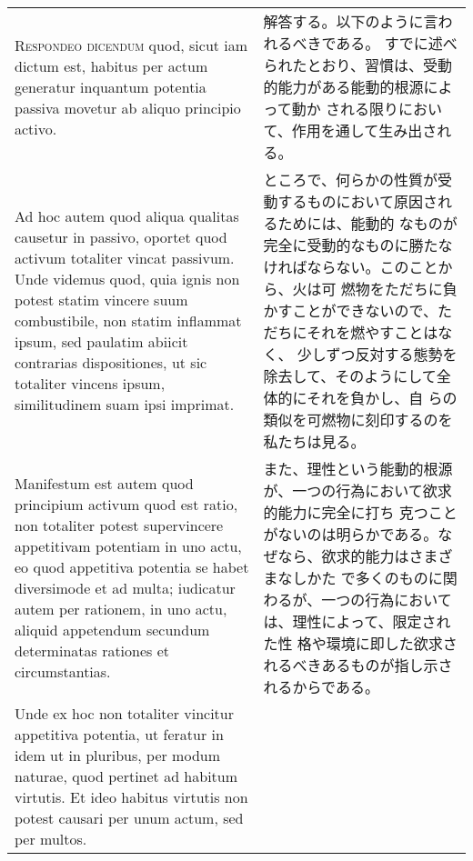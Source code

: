 \documentclass[10pt]{jsarticle} %
\begin{document}
\begin{longtable}{p{21em}p{21em}}
\\



{\scshape Respondeo dicendum} quod, sicut iam dictum est, habitus per actum
generatur inquantum potentia passiva movetur ab aliquo principio
activo.

&

解答する。以下のように言われるべきである。
すでに述べられたとおり、習慣は、受動的能力がある能動的根源によって動か
される限りにおいて、作用を通して生み出される。

\\


Ad hoc autem quod aliqua qualitas causetur in passivo, oportet quod
activum totaliter vincat passivum. Unde videmus quod, quia ignis non
potest statim vincere suum combustibile, non statim inflammat ipsum,
sed paulatim abiicit contrarias dispositiones, ut sic totaliter
vincens ipsum, similitudinem suam ipsi imprimat.


&

ところで、何らかの性質が受動するものにおいて原因されるためには、能動的
なものが完全に受動的なものに勝たなければならない。このことから、火は可
燃物をただちに負かすことができないので、ただちにそれを燃やすことはなく、
少しずつ反対する態勢を除去して、そのようにして全体的にそれを負かし、自
らの類似を可燃物に刻印するのを私たちは見る。

\\

Manifestum est autem quod principium activum quod est ratio, non
totaliter potest supervincere appetitivam potentiam in uno actu, eo
quod appetitiva potentia se habet diversimode et ad multa; iudicatur
autem per rationem, in uno actu, aliquid appetendum secundum
determinatas rationes et circumstantias.


&

また、理性という能動的根源が、一つの行為において欲求的能力に完全に打ち
克つことがないのは明らかである。なぜなら、欲求的能力はさまざまなしかた
で多くのものに関わるが、一つの行為においては、理性によって、限定された性
格や環境に即した欲求されるべきあるものが指し示されるからである。

\\

Unde ex hoc non totaliter vincitur appetitiva potentia, ut feratur in
idem ut in pluribus, per modum naturae, quod pertinet ad habitum
virtutis. Et ideo habitus virtutis non potest causari per unum actum,
sed per multos.

&


\end{longtable}
\end{document}
